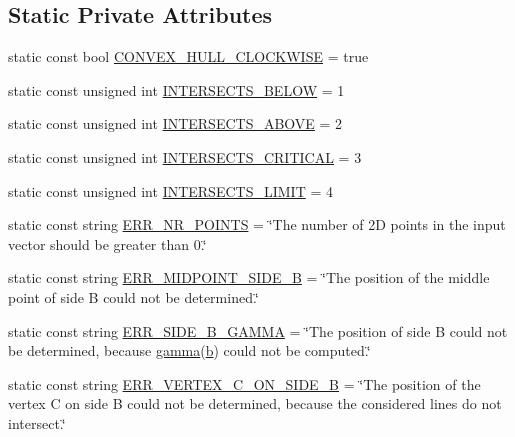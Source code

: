 \subsection*{\-Static \-Private \-Attributes}
\begin{DoxyCompactItemize}
\item 
static const bool \hyperlink{classmultiscale_1_1MinEnclosingTriangleFinder_a951b35e4f359e61301deb0840abea51a}{\-C\-O\-N\-V\-E\-X\-\_\-\-H\-U\-L\-L\-\_\-\-C\-L\-O\-C\-K\-W\-I\-S\-E} = true
\item 
static const unsigned int \hyperlink{classmultiscale_1_1MinEnclosingTriangleFinder_ab3251c940d6ca18e9339d1d168390ab6}{\-I\-N\-T\-E\-R\-S\-E\-C\-T\-S\-\_\-\-B\-E\-L\-O\-W} = 1
\item 
static const unsigned int \hyperlink{classmultiscale_1_1MinEnclosingTriangleFinder_ab44440be62a75f528ccc11753ce66b52}{\-I\-N\-T\-E\-R\-S\-E\-C\-T\-S\-\_\-\-A\-B\-O\-V\-E} = 2
\item 
static const unsigned int \hyperlink{classmultiscale_1_1MinEnclosingTriangleFinder_a55ae42aad114fcd3d1b17ae181e3cdfb}{\-I\-N\-T\-E\-R\-S\-E\-C\-T\-S\-\_\-\-C\-R\-I\-T\-I\-C\-A\-L} = 3
\item 
static const unsigned int \hyperlink{classmultiscale_1_1MinEnclosingTriangleFinder_a2d3db503338bc7b70a2e7122eb5b13e3}{\-I\-N\-T\-E\-R\-S\-E\-C\-T\-S\-\_\-\-L\-I\-M\-I\-T} = 4
\item 
static const string \hyperlink{classmultiscale_1_1MinEnclosingTriangleFinder_af42f92155e17b69fc5b309dfcf160ad7}{\-E\-R\-R\-\_\-\-N\-R\-\_\-\-P\-O\-I\-N\-T\-S} = \char`\"{}\-The number of 2\-D points in the input vector should be greater than 0.\char`\"{}
\item 
static const string \hyperlink{classmultiscale_1_1MinEnclosingTriangleFinder_a39758a67f9d66d46f128f23fa7027d68}{\-E\-R\-R\-\_\-\-M\-I\-D\-P\-O\-I\-N\-T\-\_\-\-S\-I\-D\-E\-\_\-\-B} = \char`\"{}\-The position of the middle point of side \-B could not be determined.\char`\"{}
\item 
static const string \hyperlink{classmultiscale_1_1MinEnclosingTriangleFinder_a84e5ff8e5fec501f3d3b9ac6ee2416ee}{\-E\-R\-R\-\_\-\-S\-I\-D\-E\-\_\-\-B\-\_\-\-G\-A\-M\-M\-A} = \char`\"{}\-The position of side \-B could not be determined, because \hyperlink{classmultiscale_1_1MinEnclosingTriangleFinder_a800413be1e1567d986a92fac4a6b937e}{gamma}(\hyperlink{classmultiscale_1_1MinEnclosingTriangleFinder_a71355f44126b38a4fb55c0c92ab64816}{b}) could not be computed.\char`\"{}
\item 
static const string \hyperlink{classmultiscale_1_1MinEnclosingTriangleFinder_a8e551d77bc36b7696ea969823f5720d1}{\-E\-R\-R\-\_\-\-V\-E\-R\-T\-E\-X\-\_\-\-C\-\_\-\-O\-N\-\_\-\-S\-I\-D\-E\-\_\-\-B} = \char`\"{}\-The position of the vertex \-C on side \-B could not be determined, because the considered lines do not intersect.\char`\"{}

\end{DoxyCompactItemize}
